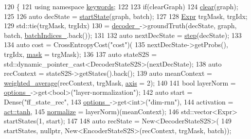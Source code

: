 \begin{DoxyCode}
120                                              \{
121     \textcolor{keyword}{using namespace }\hyperlink{namespacekeywords}{keywords};
122 
123     \textcolor{keywordflow}{if}(clearGraph)
124       \hyperlink{classmarian_1_1EncoderDecoder_ad42d2109d87d2bd25da7f1a6bb72777c}{clear}(graph);
125 
126     \textcolor{keyword}{auto} decState = \hyperlink{classmarian_1_1EncoderDecoder_ad4e4f2b699812b5e082ebc10f31ab433}{startState}(graph, batch);
127 
128     \hyperlink{namespacemarian_a498d8baf75b754011078b890b39c8e12}{Expr} trgMask, trgIdx;
129     std::tie(trgMask, trgIdx)
130         = \hyperlink{classmarian_1_1EncoderDecoder_a3e86046f2f51b1f2b146f366afea9c3b}{decoder\_}->groundTruth(decState, graph, batch, \hyperlink{classmarian_1_1EncoderDecoder_a7ca0d84733de420d7103df7a9e65b7ad}{batchIndices\_}.back());
131 
132     \textcolor{keyword}{auto} nextDecState = \hyperlink{classmarian_1_1EncoderDecoder_a558f6af38685965b966512478de18c4b}{step}(decState);
133 
134     \textcolor{keyword}{auto} cost = CrossEntropyCost(\textcolor{stringliteral}{"cost"})(
135         nextDecState->getProbs(), trgIdx, \hyperlink{namespacemarian_1_1keywords_a201bea6bea8108889b63081132cc3cd7}{mask} = trgMask);
136 
137     \textcolor{keyword}{auto} stateS2S = std::dynamic\_pointer\_cast<DecoderStateS2S>(nextDecState);
138     \textcolor{keyword}{auto} recContext = stateS2S->getStates().back();
139     \textcolor{keyword}{auto} meanContext = \hyperlink{namespacemarian_a8ccb9507a69a32ecd48410fd1557f209}{weighted\_average}(recContext, trgMask, 
      \hyperlink{namespacemarian_1_1keywords_ace9158eabbddaca833133f12da98b9d6}{axis} = 2);
140 
141     \textcolor{keywordtype}{bool} layerNorm = \hyperlink{classmarian_1_1EncoderDecoder_a467e7d547bd7888d1bea248e99cef212}{options\_}->get<\textcolor{keywordtype}{bool}>(\textcolor{stringliteral}{"layer-normalization"});
142     \textcolor{keyword}{auto} start = Dense(\textcolor{stringliteral}{"ff\_state\_rec"},
143                        \hyperlink{classmarian_1_1EncoderDecoder_a467e7d547bd7888d1bea248e99cef212}{options\_}->get<\textcolor{keywordtype}{int}>(\textcolor{stringliteral}{"dim-rnn"}),
144                        activation = \hyperlink{namespacemarian_ab84fcdb2b1fa95f89e3921aea4027957}{act::tanh},
145                        \hyperlink{namespacemarian_1_1keywords_a0865ee916b32905390a7c6e6bdfd8a9f}{normalize} = layerNorm)(meanContext);
146     std::vector<Expr> startStates(1, start);
147 
148     \textcolor{keyword}{auto} recState = New<DecoderStateS2S>(
149         startStates, \textcolor{keyword}{nullptr}, New<EncoderStateS2S>(recContext, trgMask, batch));

\end{DoxyCode}
